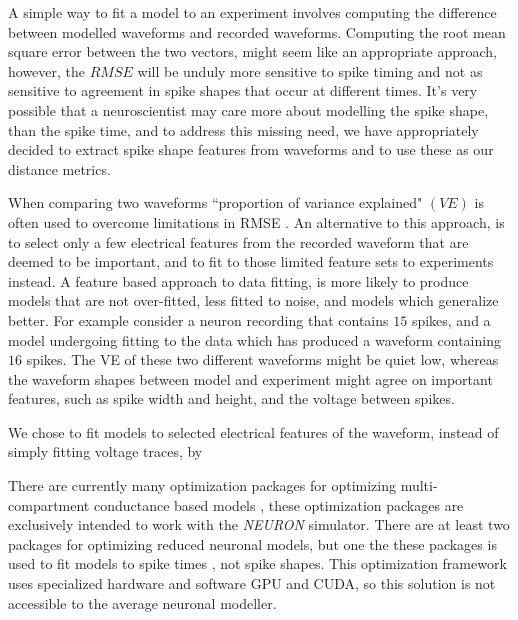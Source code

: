 A simple way to fit a model to an experiment involves computing the difference between modelled waveforms and recorded waveforms. Computing the root mean square error between the two vectors, might seem like an appropriate approach, however, the $RMSE$  will be unduly more sensitive to spike timing and not as sensitive to agreement in spike shapes that occur at different times. It's very possible that a neuroscientist may care more about modelling the spike shape, than the spike time, and to address this missing need, we have appropriately decided to extract spike shape features from waveforms and to use these as our distance metrics.

When comparing two waveforms ``proportion of variance explained" $(VE)$ is often used to overcome limitations in RMSE \citep{schoppe2016measuring}. An alternative to this approach, is to select only a few electrical features from the recorded waveform that are deemed to be important, and to fit to those limited feature sets to experiments instead. A feature based approach to data fitting, is more likely to produce models that are not over-fitted, less fitted to noise, and models which generalize better. For example consider a neuron recording that contains $15$ spikes, and a model undergoing fitting to the data which has produced a waveform containing $16$ spikes. The VE of these two different waveforms might be quiet low, whereas the waveform shapes between model and experiment might agree on important features, such as spike width and height, and the voltage between spikes.


We chose to fit models to selected electrical features of the waveform, instead of simply fitting voltage traces, by 


There are currently many optimization packages for optimizing multi-compartment conductance based models \citep{friedrich2014flexible} \citep{bluepyopt} \citep{neurotune},  these optimization packages are exclusively intended to work with the \emph{NEURON} simulator. There are at least two packages for optimizing reduced neuronal models, but one the these packages is used to fit models to spike times \citep{rossant2010automatic}, not spike shapes. This optimization framework uses specialized hardware and software GPU and CUDA, so this solution is not accessible to the average neuronal modeller.

